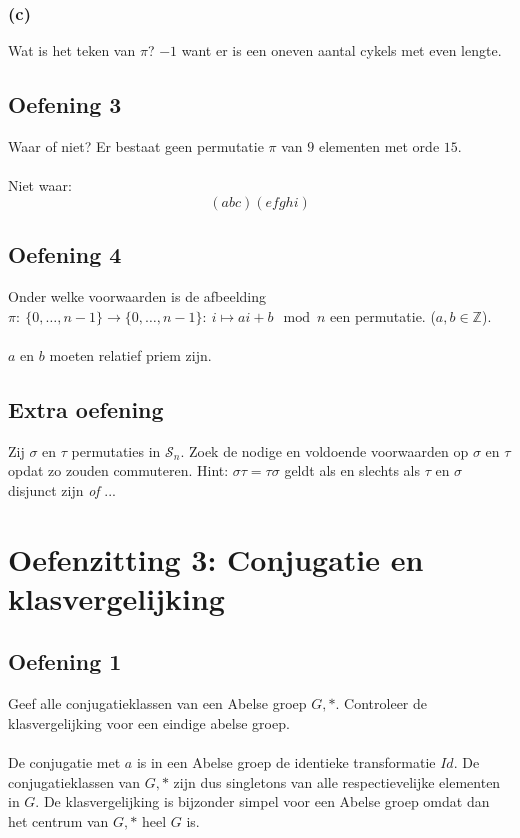 \documentclass[main.tex]{subfiles}
\begin{document}
\subsubsection*{(c)}
Wat is het teken van $\pi$?
$-1$ want er is een oneven aantal cykels met even lengte.

\subsection*{Oefening 3}
\label{oza:oz2-oef3}
Waar of niet?
Er bestaat geen permutatie $\pi$ van $9$ elementen met orde $15$.\\\\
Niet waar:
\[ (abc)(efghi) \]

\subsection*{Oefening 4}
\label{oza:oz2-oef4}
Onder welke voorwaarden is de afbeelding $\pi:\ \{ 0,\dotsc, n-1 \} \rightarrow \{ 0,\dotsc, n-1 \}:\ i \mapsto ai + b \mod n$ een permutatie. ($a,b \in \mathbb{Z}$).\\\\
$a$ en $b$ moeten relatief priem zijn.
\waarom

\subsection*{Extra oefening}
\label{oza:oz2-extra}
Zij $\sigma$ en $\tau$ permutaties in $\mathcal{S}_{n}$.
Zoek de nodige en voldoende voorwaarden op $\sigma$ en $\tau$ opdat zo zouden commuteren.
Hint: $\sigma \tau = \tau \sigma$ geldt als en slechts als $\tau$ en $\sigma$ disjunct zijn \emph{of} ...

\section{Oefenzitting 3: Conjugatie en klasvergelijking}

\subsection*{Oefening 1}
\label{sec:oz3-oef1}
Geef alle conjugatieklassen van een Abelse groep $G,*$.
Controleer de klasvergelijking voor een eindige abelse groep.\\\\
De conjugatie met $a$ is in een Abelse groep de identieke transformatie $Id$.
De conjugatieklassen van $G,*$ zijn dus singletons van alle respectievelijke elementen in $G$.
De klasvergelijking is bijzonder simpel voor een Abelse groep omdat dan het centrum van $G,*$ heel $G$ is.
\end{document}

